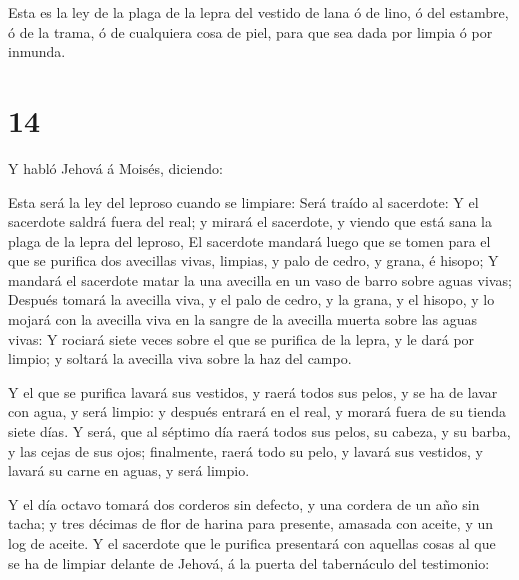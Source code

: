  Esta es la ley de la plaga de la lepra del vestido de lana
ó de lino, ó del estambre, ó de la trama, ó de cualquiera cosa de piel,
para que sea dada por limpia ó por inmunda.

\hypertarget{section-13}{%
\section{14}\label{section-13}}

 Y habló Jehová á Moisés, diciendo:

 Esta será la ley del leproso cuando se limpiare: Será
traído al sacerdote:  Y el sacerdote saldrá fuera del real;
y mirará el sacerdote, y viendo que está sana la plaga de la lepra del
leproso,  El sacerdote mandará luego que se tomen para el
que se purifica dos avecillas vivas, limpias, y palo de cedro, y grana,
é hisopo;  Y mandará el sacerdote matar la una avecilla en
un vaso de barro sobre aguas vivas;  Después tomará la
avecilla viva, y el palo de cedro, y la grana, y el hisopo, y lo mojará
con la avecilla viva en la sangre de la avecilla muerta sobre las aguas
vivas:  Y rociará siete veces sobre el que se purifica de la
lepra, y le dará por limpio; y soltará la avecilla viva sobre la haz del
campo.

 Y el que se purifica lavará sus vestidos, y raerá todos sus
pelos, y se ha de lavar con agua, y será limpio: y después entrará en el
real, y morará fuera de su tienda siete días.  Y será, que
al séptimo día raerá todos sus pelos, su cabeza, y su barba, y las cejas
de sus ojos; finalmente, raerá todo su pelo, y lavará sus vestidos, y
lavará su carne en aguas, y será limpio.

 Y el día octavo tomará dos corderos sin defecto, y una
cordera de un año sin tacha; y tres décimas de flor de harina para
presente, amasada con aceite, y un log de aceite.  Y el
sacerdote que le purifica presentará con aquellas cosas al que se ha de
limpiar delante de Jehová, á la puerta del tabernáculo del testimonio:

